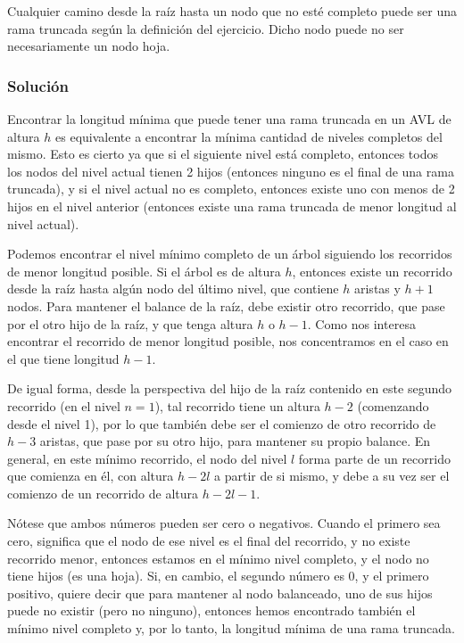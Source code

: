 \documentclass{article}
\begin{document}
Cualquier camino desde la raíz hasta un nodo que no esté completo puede ser una rama truncada según la definición del ejercicio. Dicho nodo puede no ser necesariamente un nodo hoja.
\subsubsection*{Solución}
Encontrar la longitud mínima que puede tener una rama truncada en un AVL de altura $h$ es equivalente a encontrar la mínima cantidad de niveles completos del mismo. Esto es cierto ya que si el siguiente nivel está completo, entonces todos los nodos del nivel actual tienen 2 hijos (entonces ninguno es el final de una rama truncada), y si el nivel actual no es completo, entonces existe uno con menos de 2 hijos en el nivel anterior (entonces existe una rama truncada de menor longitud al nivel actual).

Podemos encontrar el nivel mínimo completo de un árbol siguiendo los recorridos de menor longitud posible. Si el árbol es de altura $h$, entonces existe un recorrido desde la raíz hasta algún nodo del último nivel, que contiene $h$ aristas y $h+1$ nodos. Para mantener el balance de la raíz, debe existir otro recorrido, que pase por el otro hijo de la raíz, y que tenga altura $h$ o $h-1$. Como nos interesa encontrar el recorrido de menor longitud posible, nos concentramos en el caso en el que tiene longitud $h-1$.

De igual forma, desde la perspectiva del hijo de la raíz contenido en este segundo recorrido (en el nivel $n=1$), tal recorrido tiene un altura $h-2$ (comenzando desde el nivel 1), por lo que también debe ser el comienzo de otro recorrido de $h-3$ aristas, que pase por su otro hijo, para mantener su propio balance. En general, en este mínimo recorrido, el nodo del nivel $l$ forma parte de un recorrido que comienza en él, con altura $h-2l$ a partir de si mismo, y debe a su vez ser el comienzo de un recorrido de altura $h-2l-1$.

Nótese que ambos números pueden ser cero o negativos. Cuando el primero sea cero, significa que el nodo de ese nivel es el final del recorrido, y no existe recorrido menor, entonces estamos en el mínimo nivel completo, y el nodo no tiene hijos (es una hoja). Si, en cambio, el segundo número es 0, y el primero positivo, quiere decir que para mantener al nodo balanceado, uno de sus hijos puede no existir (pero no ninguno), entonces hemos encontrado también el mínimo nivel completo y, por lo tanto, la longitud mínima de una rama truncada.
\end{document}
